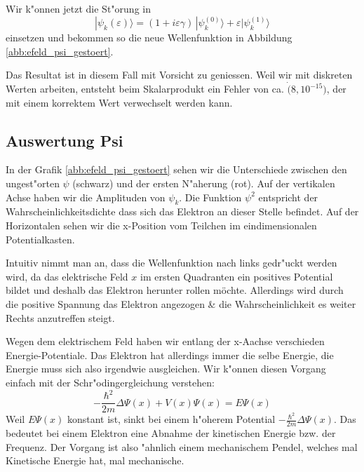 \begin{refsection}
Wir k"onnen jetzt die St"orung in 
\begin{equation}
|\psi_k(\varepsilon)\rangle
=
(1+i\varepsilon \gamma)
\,|\psi_k^{(0)}\rangle
+
\varepsilon|\psi_k^{(1)}\rangle
\end{equation}
einsetzen und bekommen so die neue Wellenfunktion in Abbildung \ref{abb:efeld_psi_gestoert}.

Das Resultat ist in diesem Fall mit Vorsicht zu geniessen.
Weil wir mit diskreten Werten arbeiten, entsteht beim Skalarprodukt ein Fehler von ca. $\dot(8, 10^{-15})$,
der mit einem korrektem Wert verwechselt werden kann.




\subsection{Auswertung Psi}

In der Grafik \ref{abb:efeld_psi_gestoert} sehen wir die Unterschiede zwischen den ungest"orten $\psi$ (schwarz) und der ersten N"aherung (rot).
Auf der vertikalen Achse haben wir die Amplituden von $\psi_k$.
Die Funktion $\psi^2$ entspricht der Wahrscheinlichkeitsdichte dass sich das Elektron an dieser Stelle befindet.
Auf der Horizontalen sehen wir die x-Position vom Teilchen im eindimensionalen Potentialkasten.

Intuitiv nimmt man an, dass die Wellenfunktion nach links gedr"uckt werden wird, da das
elektrische Feld $x$ im ersten Quadranten ein positives Potential bildet
und deshalb das Elektron herunter rollen m\"ochte.
Allerdings wird durch die positive Spannung das Elektron angezogen \& die
Wahrscheinlichkeit es weiter Rechts anzutreffen steigt.

Wegen dem elektrischem Feld haben wir entlang der x-Aachse verschieden Energie-Potentiale.
Das Elektron hat allerdings immer die selbe Energie,
die Energie muss sich also irgendwie ausgleichen.
Wir k"onnen diesen Vorgang einfach mit der Schr"odingergleichung verstehen:
\[
-\frac{\hbar^2}{2m}\Delta\Psi(x) + V(x)\Psi(x)
=
E \Psi(x)
\]
Weil $E \Psi(x)$ konstant ist, sinkt bei einem h"oherem Potential $-\frac{\hbar^2}{2m}\Delta\Psi(x)$.
Das bedeutet bei einem Elektron eine Abnahme der kinetischen Energie bzw. der Frequenz.
Der Vorgang ist also "ahnlich einem mechanischem Pendel, welches mal Kinetische Energie hat, mal mechanische.


\end{refsection}
